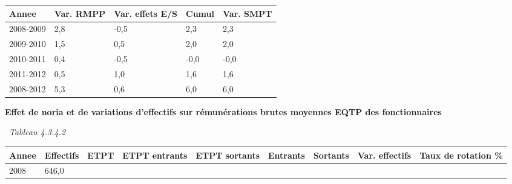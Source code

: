 \begin{longtable}[]{@{}lllll@{}}
\toprule
Annee & Var. RMPP & Var. effets E/S & Cumul & Var. SMPT\tabularnewline
\midrule
\endhead
2008-2009 & 2,8 & -0,5 & 2,3 & 2,3\tabularnewline
2009-2010 & 1,5 & 0,5 & 2,0 & 2,0\tabularnewline
2010-2011 & 0,4 & -0,5 & -0,0 & -0,0\tabularnewline
2011-2012 & 0,5 & 1,0 & 1,6 & 1,6\tabularnewline
2008-2012 & 5,3 & 0,6 & 6,0 & 6,0\tabularnewline
\bottomrule
\end{longtable}

\textbf{Effet de noria et de variations d'effectifs sur rémunérations
brutes moyennes EQTP des fonctionnaires}

~\emph{Tableau 4.3.4.2}

\begin{longtable}[]{@{}lllllllll@{}}
\toprule
\begin{minipage}[b]{0.05\columnwidth}\raggedright
Annee\strut
\end{minipage} & \begin{minipage}[b]{0.08\columnwidth}\raggedright
Effectifs\strut
\end{minipage} & \begin{minipage}[b]{0.05\columnwidth}\raggedright
ETPT\strut
\end{minipage} & \begin{minipage}[b]{0.10\columnwidth}\raggedright
ETPT entrants\strut
\end{minipage} & \begin{minipage}[b]{0.10\columnwidth}\raggedright
ETPT sortants\strut
\end{minipage} & \begin{minipage}[b]{0.07\columnwidth}\raggedright
Entrants\strut
\end{minipage} & \begin{minipage}[b]{0.07\columnwidth}\raggedright
Sortants\strut
\end{minipage} & \begin{minipage}[b]{0.11\columnwidth}\raggedright
Var. effectifs\strut
\end{minipage} & \begin{minipage}[b]{0.14\columnwidth}\raggedright
Taux de rotation \%\strut
\end{minipage}\tabularnewline
\midrule
\endhead
\begin{minipage}[t]{0.05\columnwidth}\raggedright
2008\strut
\end{minipage} & \begin{minipage}[t]{0.08\columnwidth}\raggedright
646,0\strut

\end{minipage}
\end{longtable}
